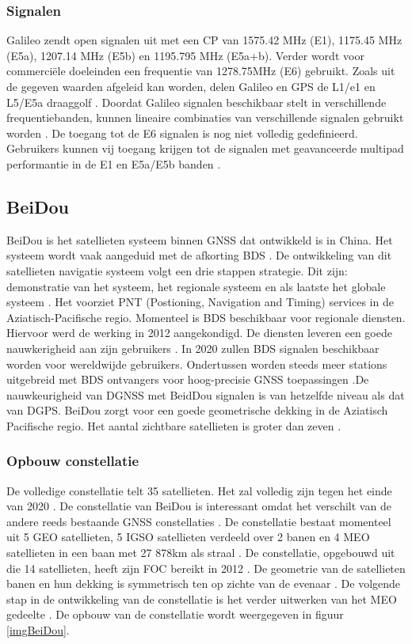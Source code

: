 \subsubsection{Signalen}
Galileo zendt open signalen uit met een CP van 1575.42 MHz (E1), 1175.45 MHz (E5a), 1207.14 MHz (E5b) en 1195.795 MHz (E5a+b). Verder wordt voor commerci\"ele doeleinden een frequentie van 1278.75MHz (E6) gebruikt. Zoals uit de gegeven waarden afgeleid kan worden, delen Galileo en GPS de  L1/e1 en L5/E5a draaggolf \cite{LBibPPP2}. Doordat Galileo signalen beschikbaar stelt in verschillende frequentiebanden, kunnen lineaire combinaties van verschillende signalen gebruikt worden \cite{LBibGalileo3}. De toegang tot de E6 signalen is nog niet volledig gedefinieerd. Gebruikers kunnen vij toegang krijgen tot de signalen met geavanceerde multipad performantie in de E1 en E5a/E5b banden \cite{LBibGNSS9}. 

\subsection{BeiDou}
\label{LBeD}
BeiDou is het satellieten systeem binnen GNSS dat ontwikkeld is in China. Het systeem wordt vaak  aangeduid met de afkorting BDS \cite{LBibBeiDou}. De ontwikkeling van dit satellieten navigatie systeem volgt een drie stappen strategie. Dit zijn: demonstratie van het systeem, het regionale systeem en als laatste het globale systeem \cite{LBibBeiDou4}. Het voorziet PNT (Postioning, Navigation and Timing) services in de Aziatisch-Pacifische regio. Momenteel is BDS  beschikbaar voor regionale diensten. Hiervoor werd de werking in 2012 aangekondigd. De diensten leveren een goede nauwkerigheid aan zijn gebruikers \cite{LBibBeiDou, LBibGNSS9}. In 2020 zullen BDS signalen beschikbaar worden voor wereldwijde gebruikers. Ondertussen worden steeds meer stations uitgebreid met BDS ontvangers voor hoog-precisie GNSS toepassingen \cite{LBibBeiDou}.De nauwkeurigheid van DGNSS met BeidDou signalen is van hetzelfde niveau als dat van DGPS. BeiDou zorgt voor een goede geometrische dekking in de Aziatisch Pacifische regio. Het aantal zichtbare satellieten is groter dan zeven \cite{LBibBeiDou4}. 

\subsubsection{Opbouw constellatie}
De volledige constellatie telt 35 satellieten. Het zal volledig zijn tegen het einde van 2020 \cite{LBibGNSS4}. De constellatie van BeiDou is interessant omdat het verschilt van de andere reeds bestaande GNSS constellaties \cite{LBibBeiDou3}.  De constellatie bestaat momenteel uit 5 GEO satellieten, 5 IGSO satellieten verdeeld over 2 banen en 4 MEO satellieten in een baan met 27 878km als straal \cite{LBibBeiDou2}. De constellatie, opgebouwd uit die 14 satellieten, heeft zijn FOC bereikt in 2012 \cite{LBibBeiDou4}. De geometrie van de satellieten banen en hun dekking is symmetrisch ten op zichte van de evenaar \cite{LBibBeiDou5}.  De volgende stap in de ontwikkeling van de constellatie is het verder uitwerken van het MEO gedeelte \cite{LBibPPP2}. De opbouw van de constellatie wordt weergegeven in figuur \ref{imgBeiDou}.

